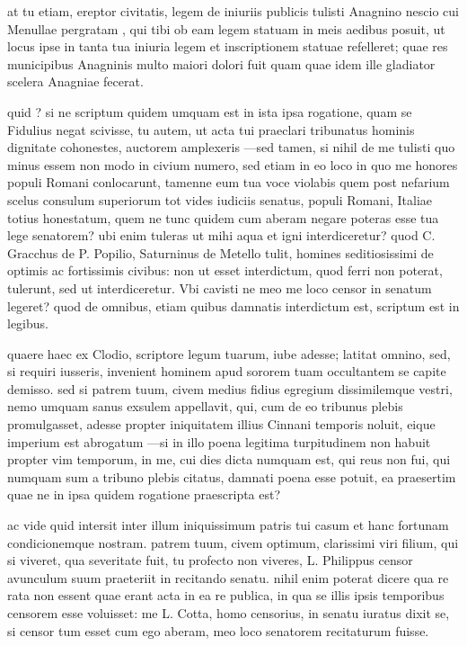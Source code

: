  at tu etiam, ereptor civitatis, legem de iniuriis publicis tulisti Anagnino nescio cui Menullae pergratam , qui tibi ob eam legem statuam in meis aedibus posuit, ut locus ipse in tanta tua iniuria legem et inscriptionem statuae refelleret; quae res municipibus Anagninis multo maiori dolori fuit quam quae idem ille gladiator scelera Anagniae fecerat.

 quid ? si ne scriptum quidem umquam est in ista ipsa rogatione, quam se Fidulius negat scivisse, tu autem, ut acta tui praeclari tribunatus hominis dignitate cohonestes, auctorem amplexeris —sed tamen, si nihil de me tulisti quo minus essem non modo in civium numero, sed etiam in eo loco in quo me honores populi Romani conlocarunt, tamenne eum tua voce violabis quem post nefarium scelus consulum superiorum tot vides iudiciis senatus, populi Romani, Italiae totius honestatum, quem ne tunc quidem cum aberam negare poteras esse tua lege senatorem? ubi enim tuleras ut mihi aqua et igni interdiceretur? quod C. Gracchus de P. Popilio, Saturninus de Metello tulit, homines seditiosissimi de optimis ac fortissimis civibus: non ut esset interdictum, quod ferri non poterat, tulerunt, sed ut interdiceretur. Vbi cavisti ne meo me loco censor in senatum legeret? quod de omnibus, etiam quibus damnatis interdictum est, scriptum est in legibus.

 quaere haec ex Clodio, scriptore legum tuarum, iube adesse; latitat omnino, sed, si requiri iusseris, invenient hominem apud sororem tuam occultantem se capite demisso. sed si patrem tuum, civem medius fidius egregium dissimilemque vestri, nemo umquam sanus exsulem appellavit, qui, cum de eo tribunus plebis promulgasset, adesse propter iniquitatem illius Cinnani temporis noluit, eique imperium est abrogatum —si in illo poena legitima turpitudinem non habuit propter vim temporum, in me, cui dies dicta numquam est, qui reus non fui, qui numquam sum a tribuno plebis citatus, damnati poena esse potuit, ea praesertim quae ne in ipsa quidem rogatione praescripta est?

 ac vide quid intersit inter illum iniquissimum patris tui casum et hanc fortunam condicionemque nostram. patrem tuum, civem optimum, clarissimi viri filium, qui si viveret, qua severitate fuit, tu profecto non viveres, L. Philippus censor avunculum suum praeteriit in recitando senatu. nihil enim poterat dicere qua re rata non essent quae erant acta in ea re publica, in qua se illis ipsis temporibus censorem esse voluisset: me L. Cotta, homo censorius, in senatu iuratus dixit se, si censor tum esset cum ego aberam, meo loco senatorem recitaturum fuisse.

